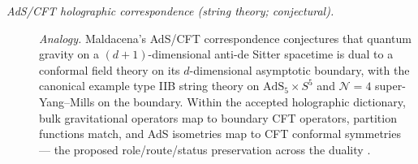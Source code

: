 \begin{description}
\item[\emph{{AdS}/{CFT} holographic correspondence (string
theory; conjectural).}] \textit{Analogy.}
Maldacena's AdS/CFT correspondence conjectures that quantum gravity
on a \((d+1)\)-dimensional anti-de Sitter spacetime is dual to a
conformal field theory on its \(d\)-dimensional asymptotic
boundary, with the canonical example type IIB string theory on
\(\mathrm{AdS}_5\times S^5\) and \(\mathcal N=4\) super-Yang--Mills
on the boundary.  Within the accepted holographic dictionary, bulk
gravitational operators map to boundary CFT operators, partition
functions match, and AdS isometries map to CFT conformal
symmetries --- the proposed  role/route/status preservation
across the duality
\citep{Maldacena1997LargeN}.
\end{description}
\endgroup

